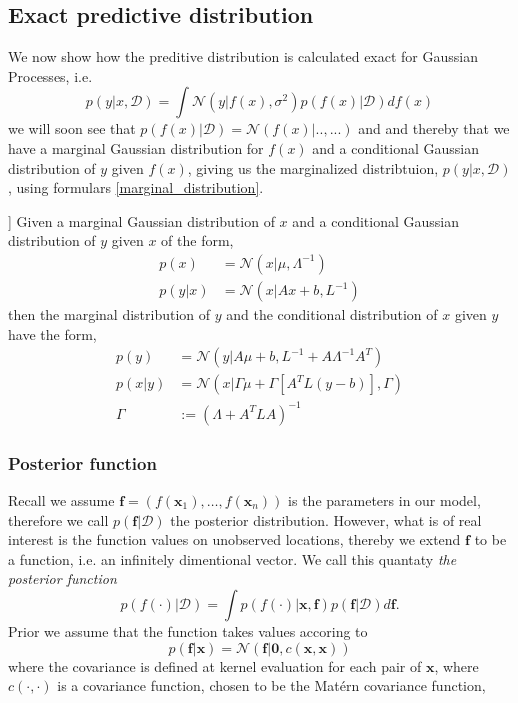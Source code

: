 \subsection{Exact predictive distribution}
We now show how the preditive distribution is calculated exact for
Gaussian Processes, i.e. 
\begin{equation}\label{GP_predictive2}
    p(y|x,\mathcal{D}) = \int \mathcal{N}(y|f(x), \sigma^2) p(f(x)|\mathcal{D})df(x)
\end{equation}
we will soon see that $p(f(x)|\mathcal{D}) = \mathcal{N}(f(x)| .., ...)$ and
and thereby that we have a marginal Gaussian distribution for $f(x)$ and a 
conditional Gaussian distribution of $y$ given $f(x)$, giving us the marginalized
distribtuion, $p(y|x,\mathcal{D})$, using formulars \eqref{marginal_distribution}. 

\begin{testexample2}[Trick with normal distributions [from Bishops book?]]
    Given a marginal Gaussian distribution of $x$ and a conditional Gaussian distribution
    of $y$ given $x$ of the form, 
    \begin{align*}
        p(x) &= \mathcal{N}(x|\mu, \Lambda^{-1})\\
        p(y|x) &= \mathcal{N}(x|Ax+b, L^{-1})
    \end{align*}
    then the marginal distribution of $y$ and the conditional distribution of $x$ given $y$
    have the form, 
    \begin{align}
        p(y) &= \mathcal{N}(y|A\mu+b,L^{-1}+A \Lambda^{-1}A^T) \label{marginal_distribution}\\
        p(x|y) &= \mathcal{N}(x|\Gamma \mu+\Gamma [A^TL(y-b)],\Gamma )\\
        \Gamma &:= (\Lambda +A^TLA)^{-1}
    \end{align}
\end{testexample2}

\subsubsection*{Posterior function}
Recall we assume $\textbf{f} = (f(\textbf{x}_1), \dots, f(\textbf{x}_n))$ is the parameters in 
our model, therefore we call $p(\textbf{f}|\mathcal{D})$ the posterior distribution. However, 
what is of real interest is the function values on unobserved locations, thereby we 
extend $\textbf{f}$ to be a function, i.e. an infinitely dimentional vector. We call this 
quantaty \textit{the posterior function} 
\begin{equation}\label{posterior_function}
    p(f(\cdot)|\mathcal{D})= \int p(f(\cdot)|\textbf{x}, \textbf{f})p(\textbf{f}|\mathcal{D})d\textbf{f}.
\end{equation}
Prior we assume that the function takes values accoring to
$$p(\textbf{f}|\textbf{x}) = \mathcal{N}(\textbf{f}|\textbf{0}, c(\textbf{x}, \textbf{x}))$$ where
the covariance is defined at kernel evaluation for each pair of $\textbf{x}$, where $c(\cdot,
\cdot)$ is a covariance function, chosen to be the Matérn covariance function,


